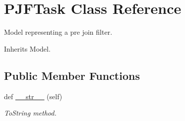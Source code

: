 \hypertarget{classjoinapp_1_1models_1_1task__management__models_1_1_p_j_f_task}{}\section{P\+J\+F\+Task Class Reference}
\label{classjoinapp_1_1models_1_1task__management__models_1_1_p_j_f_task}


Model representing a pre join filter.  




Inherits Model.

\subsection*{Public Member Functions}
\begin{DoxyCompactItemize}
\item 
def \mbox{\hyperlink{classjoinapp_1_1models_1_1task__management__models_1_1_p_j_f_task_a23e8041ce1015febe4fdace3225714f9}{\+\_\+\+\_\+str\+\_\+\+\_\+}} (self)
\begin{DoxyCompactList}\small\item\em To\+String method. \end{DoxyCompactList}\end{DoxyCompactItemize}
